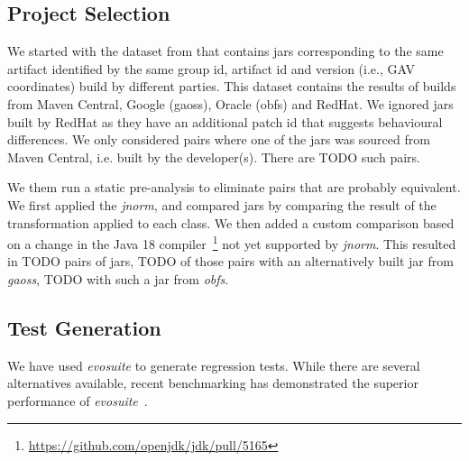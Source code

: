 \documentclass[conference]{IEEEtran}
\begin{document}
\subsection{Project Selection}

We started with the dataset from \cite{dietrich2024levelsbinaryequivalencecomparison} that contains jars corresponding to the same artifact identified by the same group id, artifact id and version (i.e., GAV coordinates) build by different parties. This dataset contains the results of builds from Maven Central, Google (gaoss), Oracle (obfs) and  RedHat. We ignored jars built by RedHat as they have an additional patch id that suggests behavioural differences.  We only considered pairs where one of the jars was sourced from Maven Central, i.e. built by the developer(s). There are TODO such pairs.

We them run a static pre-analysis to eliminate pairs that are probably equivalent. We first applied the \textit{jnorm}, and compared jars by comparing the result of the transformation applied to each class. We then added a custom comparison based on a change in the Java 18 compiler~\footnote{\url{https://github.com/openjdk/jdk/pull/5165}} not yet supported by \textit{jnorm}. This resulted in TODO pairs of jars, TODO of those pairs with an alternatively built jar from \textit{gaoss}, TODO with such a jar from \textit{obfs}.



\subsection{Test Generation}

We have used \textit{evosuite} to generate regression tests. While there are several alternatives available, recent benchmarking has demonstrated the superior performance of \textit{evosuite}~\cite{jahangirova2023sbft}.








\end{document}
